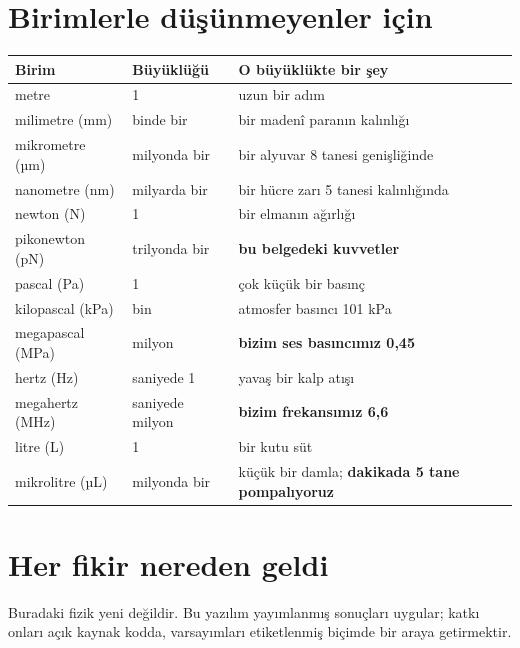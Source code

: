 \documentclass[11pt,a4paper]{article}
\begin{document}
\section{Birimlerle düşünmeyenler için}

\begin{center}\small
\begin{tabular}{lll}
\toprule
\textbf{Birim} & \textbf{Büyüklüğü} & \textbf{O büyüklükte bir şey} \\
\midrule
metre & 1 & uzun bir adım \\
milimetre (mm) & binde bir & bir madenî paranın kalınlığı \\
mikrometre (µm) & milyonda bir & bir alyuvar 8 tanesi genişliğinde \\
nanometre (nm) & milyarda bir & bir hücre zarı 5 tanesi kalınlığında \\
\midrule
newton (N) & 1 & bir elmanın ağırlığı \\
pikonewton (pN) & trilyonda bir & \textbf{bu belgedeki kuvvetler} \\
\midrule
pascal (Pa) & 1 & çok küçük bir basınç \\
kilopascal (kPa) & bin & atmosfer basıncı 101 kPa \\
megapascal (MPa) & milyon & \textbf{bizim ses basıncımız 0,45} \\
\midrule
hertz (Hz) & saniyede 1 & yavaş bir kalp atışı \\
megahertz (MHz) & saniyede milyon & \textbf{bizim frekansımız 6,6} \\
\midrule
litre (L) & 1 & bir kutu süt \\
mikrolitre (µL) & milyonda bir & küçük bir damla; \textbf{dakikada 5 tane pompalıyoruz} \\
\bottomrule
\end{tabular}
\end{center}

\section{Her fikir nereden geldi}

Buradaki fizik yeni değildir. Bu yazılım yayımlanmış sonuçları uygular; katkı
onları açık kaynak kodda, varsayımları etiketlenmiş biçimde bir araya
getirmektir.
\end{document}
